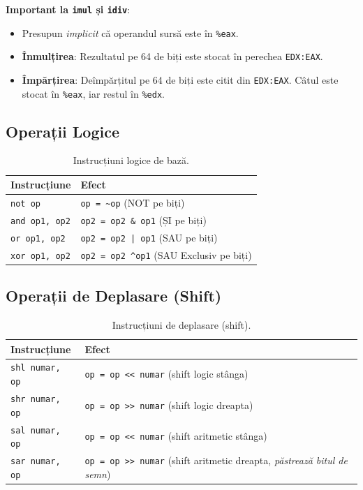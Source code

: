 \documentclass[12pt]{article}
\begin{document}
\textbf{Important la \texttt{imul} și \texttt{idiv}}:
\begin{itemize}
    \item Presupun \textit{implicit} că operandul sursă este în \texttt{\%eax}.
    \item \textbf{Înmulțirea}: Rezultatul pe 64 de biți este stocat în perechea \texttt{EDX:EAX}.
    \item \textbf{Împărțirea}: Deîmpărțitul pe 64 de biți este citit din \texttt{EDX:EAX}. Câtul este stocat în \texttt{\%eax}, iar restul în \texttt{\%edx}.
\end{itemize}

\subsection{Operații Logice}
\begin{table}[h!]
\centering
\begin{tabular}{ll}
\toprule
\textbf{Instrucțiune} & \textbf{Efect} \\
\midrule
\texttt{not op} & \texttt{op = \textasciitilde op} (NOT pe biți) \\
\texttt{and op1, op2} & \texttt{op2 = op2 \& op1} (ȘI pe biți) \\
\texttt{or op1, op2} & \texttt{op2 = op2 | op1} (SAU pe biți) \\
\texttt{xor op1, op2} & \texttt{op2 = op2 \textasciicircum op1} (SAU Exclusiv pe biți) \\
\bottomrule
\end{tabular}
\caption{Instrucțiuni logice de bază.}
\end{table}

\subsection{Operații de Deplasare (Shift)}
\begin{table}[h!]
\centering
\begin{tabular}{ll}
\toprule
\textbf{Instrucțiune} & \textbf{Efect} \\
\midrule
\texttt{shl numar, op} & \texttt{op = op << numar} (shift logic stânga) \\
\texttt{shr numar, op} & \texttt{op = op >> numar} (shift logic dreapta) \\
\texttt{sal numar, op} & \texttt{op = op << numar} (shift aritmetic stânga) \\
\texttt{sar numar, op} & \texttt{op = op >> numar} (shift aritmetic dreapta, \textit{păstrează bitul de semn}) \\
\bottomrule
\end{tabular}
\caption{Instrucțiuni de deplasare (shift).}
\end{table}
\end{document}
